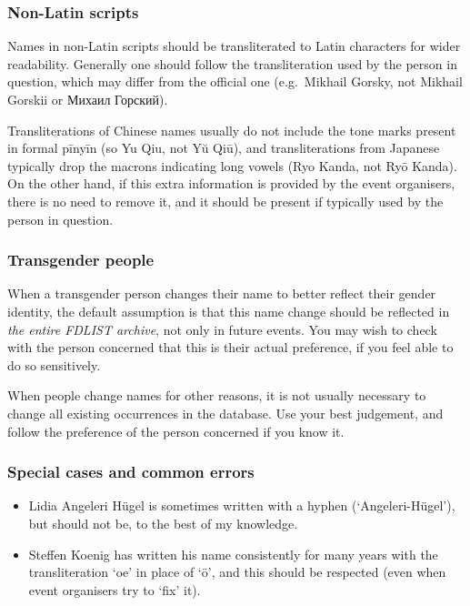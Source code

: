\documentclass[12pt]{scrartcl}
\theoremstyle{definition}
\begin{document}
\subsubsection{Non-Latin scripts}
Names in non-Latin scripts should be transliterated to Latin characters for wider readability.
Generally one should follow the transliteration used by the person in question, which may differ from the official one (e.g.\ Mikhail Gorsky, not Mikhail Gorskii or {\selectfont Михаил Горский}).

Transliterations of Chinese names usually do not include the tone marks present in formal pīnyīn (so Yu Qiu, not Yŭ Qiū), and transliterations from Japanese typically drop the macrons indicating long vowels (Ryo Kanda, not Ryō Kanda).
On the other hand, if this extra information is provided by the event organisers, there is no need to remove it, and it should be present if typically used by the person in question.

\subsubsection{Transgender people}
When a transgender person changes their name to better reflect their gender identity, the default assumption is that this name change should be reflected in \emph{the entire FDLIST archive}, not only in future events.
You may wish to check with the person concerned that this is their actual preference, if you feel able to do so sensitively.

When people change names for other reasons, it is not usually necessary to change all existing occurrences in the database.
Use your best judgement, and follow the preference of the person concerned if you know it.

\subsubsection{Special cases and common errors}
\begin{itemize}
\item Lidia Angeleri Hügel is sometimes written with a hyphen (`Angeleri-Hügel'), but should not be, to the best of my knowledge.
\item Steffen Koenig has written his name consistently for many years with the transliteration `oe' in place of `ö', and this should be respected (even when event organisers try to `fix' it).
\end{itemize}
\end{document}
